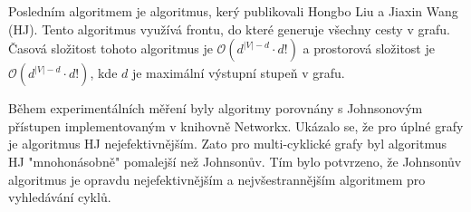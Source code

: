     Posledním algoritmem je algoritmus, kerý publikovali Hongbo Liu a Jiaxin Wang (HJ). Tento algoritmus využívá frontu, do které generuje všechny cesty v grafu. Časová složitost tohoto algoritmus je $\mathcal{O}(d^{|V|-d}\cdot d!)$ a prostorová složitost je $\mathcal{O}(d^{|V|-d}\cdot d!)$, kde $d$ je maximální výstupní stupeň v grafu.

    Během experimentálních měření byly algoritmy porovnány s Johnsonovým přístupen implementovaným v knihovně Networkx. Ukázalo se, že pro úplné grafy je algoritmus HJ nejefektivnějším. Zato pro multi-cyklické grafy byl algoritmus HJ "mnohonásobně" pomalejší než Johnsonův. Tím bylo potvrzeno, že Johnsonův algoritmus je opravdu nejefektivnějším a nejvšestrannějším algoritmem pro vyhledávání cyklů.